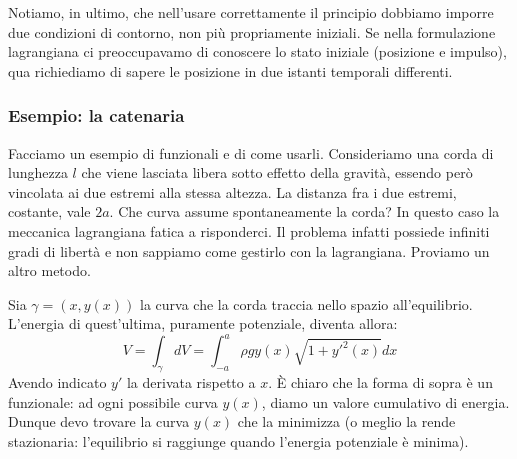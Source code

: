 \documentclass[a4paper,openany]{article}
\begin{document}
	Notiamo, in ultimo, che nell'usare correttamente il principio dobbiamo imporre due condizioni di contorno, non più propriamente iniziali. Se nella formulazione lagrangiana ci preoccupavamo di conoscere lo stato iniziale (posizione e impulso), qua richiediamo di sapere le posizione in due istanti temporali differenti.
	\subsubsection{Esempio: la catenaria}
	Facciamo un esempio di funzionali e di come usarli. Consideriamo una corda di lunghezza $l$ che viene lasciata libera sotto effetto della gravità, essendo però vincolata ai due estremi alla stessa altezza. La distanza fra i due estremi, costante, vale $2a$. Che curva assume spontaneamente la corda? In questo caso la meccanica lagrangiana fatica a risponderci. Il problema infatti possiede infiniti gradi di libertà e non sappiamo come gestirlo con la lagrangiana. Proviamo un altro metodo.
	
	Sia $\gamma = (x, y(x))$ la curva che la corda traccia nello spazio all'equilibrio. L'energia di quest'ultima, puramente potenziale, diventa allora:
	\begin{equation}\label{key}
		V = \int_{\gamma}dV = \int_{-a}^{a}\rho g y(x)\sqrt{1+y'^2(x)}dx
	\end{equation}
	Avendo indicato $y'$ la derivata rispetto a $x$. È chiaro che la forma di sopra è un funzionale: ad ogni possibile curva $y(x)$, diamo un valore cumulativo di energia. 
	Dunque devo trovare la curva $y(x)$ che la minimizza (o meglio la rende stazionaria: l'equilibrio si raggiunge quando l'energia potenziale è minima).
	
\end{document}
